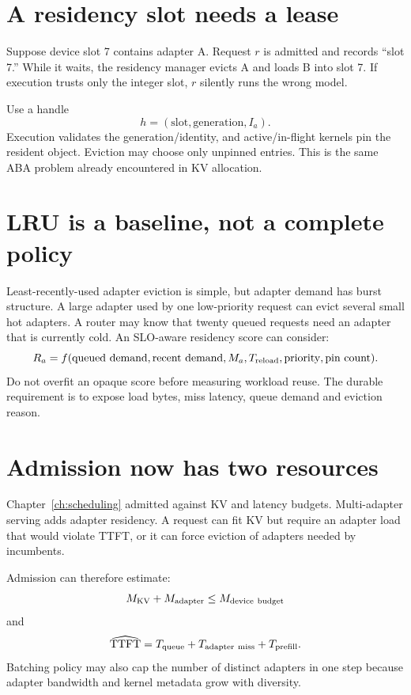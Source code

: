 \section{A residency slot needs a lease}

Suppose device slot 7 contains adapter A. Request $r$ is admitted and records
``slot 7.'' While it waits, the residency manager evicts A and loads B into slot 7.
If execution trusts only the integer slot, $r$ silently runs the wrong model.

Use a handle
\[
h=(\text{slot},\text{generation},I_a).
\]
Execution validates the generation/identity, and active/in-flight kernels pin the
resident object. Eviction may choose only unpinned entries. This is the same ABA
problem already encountered in KV allocation.

\section{LRU is a baseline, not a complete policy}

Least-recently-used adapter eviction is simple, but adapter demand has burst structure.
A large adapter used by one low-priority request can evict several small hot adapters.
A router may know that twenty queued requests need an adapter that is currently cold.
An SLO-aware residency score can consider:
\[
R_a=f(\text{queued demand},\text{recent demand},M_a,T_{\rm reload},
      \text{priority},\text{pin count}).
\]
Do not overfit an opaque score before measuring workload reuse. The durable requirement
is to expose load bytes, miss latency, queue demand and eviction reason.


\section{Admission now has two resources}

Chapter~\ref{ch:scheduling} admitted against KV and latency budgets. Multi-adapter
serving adds adapter residency. A request can fit KV but require an adapter load that
would violate TTFT, or it can force eviction of adapters needed by incumbents.

Admission can therefore estimate:
\[
M_{\rm KV}+M_{\rm adapter}\le M_{\rm device\ budget}
\]
and
\[
\widehat{\mathrm{TTFT}}=
T_{\rm queue}+T_{\rm adapter\ miss}+T_{\rm prefill}.
\]
Batching policy may also cap the number of distinct adapters in one step because
adapter bandwidth and kernel metadata grow with diversity.

